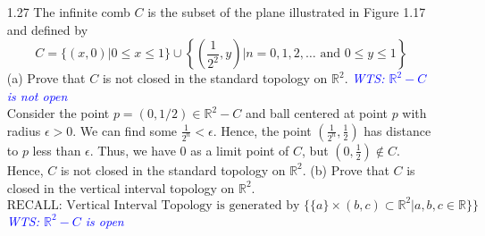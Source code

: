 \documentclass[12pt]{article}
\newcommand{\R}{\mathbb{R}}
\newcommand{\wts}[1]{\textit{\textcolor{blue}{WTS: #1}}\\}
\begin{document}
\begin{enumerate}
\begin{proof}
		\end{proof}
		\item[1.27] The infinite comb $C$ is the subset of the plane illustrated in Figure 1.17 and defined by
		\[C=\{(x, 0) | 0 \leq x \leq 1\} \cup\left\{\left(\frac{1}{2^{2}}, y\right) | n=0,1,2, \ldots \text { and } 0 \leq y \leq 1\right\}\]
		(a) Prove that $C$ is not closed in the standard topology on $\mathbb{R}^{2}$.
		\wts{$\R^2-C$ is not open}
		Consider the point $ p=(0,1/2)\in \R^2-C$ and ball centered at point $p$ with radius $ \epsilon>0 $. We can find some $ \frac{1}{2^n}<\epsilon$. Hence, the point $ (\frac{1}{2^n},\frac{1}{2}) $ has distance to $ p $ less than $ \epsilon $. Thus, we have $ 0 $ as a limit point of $ C $, but $ (0,\frac{1}{2}) \not\in C$. Hence, $ C $ is not closed in the standard topology on $ \R^2 $.
		(b) Prove that $C$ is closed in the vertical interval topology on $\mathbb{R}^{2}$.
		\[\text{RECALL: Vertical Interval Topology is generated by } \{\{a\}\times(b,c)\subset \R^2| a,b,c\in \R\}\}\]
		\wts{$\R^2-C$ is open}
		

\end{enumerate}
\end{document}
